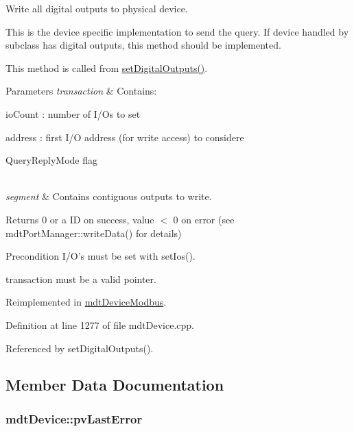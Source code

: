 Write all digital outputs to physical device. 

This is the device specific implementation to send the query. If device handled by subclass has digital outputs, this method should be implemented.

This method is called from \hyperlink{classmdt_device_a7b86a816e55a91f0d62426e1741437c6}{set\-Digital\-Outputs()}.


\begin{DoxyParams}{Parameters}
{\em transaction} & Contains\-:
\begin{DoxyItemize}
\item io\-Count \-: number of I/\-Os to set
\item address \-: first I/\-O address (for write access) to considere
\item Query\-Reply\-Mode flag 
\end{DoxyItemize}\\
\hline
{\em segment} & Contains contiguous outputs to write. \\
\hline
\end{DoxyParams}
\begin{DoxyReturn}{Returns}
0 or a I\-D on success, value $<$ 0 on error (see mdt\-Port\-Manager\-::write\-Data() for details) 
\end{DoxyReturn}
\begin{DoxyPrecond}{Precondition}
I/\-O's must be set with set\-Ios(). 

transaction must be a valid pointer. 
\end{DoxyPrecond}


Reimplemented in \hyperlink{classmdt_device_modbus_a6713edaee0bfba48791008124299b753}{mdt\-Device\-Modbus}.



Definition at line 1277 of file mdt\-Device.\-cpp.



Referenced by set\-Digital\-Outputs().



\subsection{Member Data Documentation}
\hypertarget{classmdt_device_ab54221195bbf9363f7e7f10ef38a3909}{
\subsubsection[{pv\-Last\-Error}]{ mdt\-Device\-::pv\-Last\-Error\hspace{0.3cm}{\ttfamily [protected]}}}\label{classmdt_device_ab54221195bbf9363f7e7f10ef38a3909}


